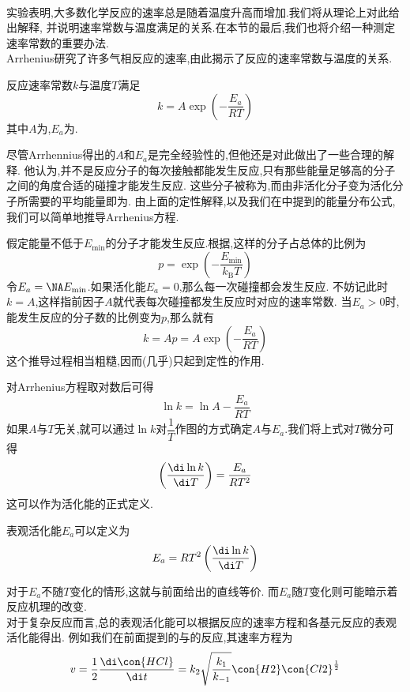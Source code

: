 \documentclass{ctexart}
\begin{document}
\pagestyle{plain}
\noindent{}\vspace{15pt}\\
\indent 实验表明,大多数化学反应的速率总是随着温度升高而增加.我们将从理论上对此给出解释,%
并说明速率常数与温度满足的关系.在本节的最后,我们也将介绍一种测定速率常数的重要办法.\vspace{12pt}\\
\indent Arrhenius研究了许多气相反应的速率,由此揭示了反应的速率常数与温度的关系.
\begin{theorem}[7E.1.1 Arrhenius方程]
    反应速率常数$k$与温度$T$满足
    \[k=A\exp\left(-\dfrac{E_a}{RT}\right)\]
    其中$A$为,$E_a$为.
\end{theorem}
尽管Arrhennius得出的$A$和$E_a$是完全经验性的,但他还是对此做出了一些合理的解释.%
他认为,并不是反应分子的每次接触都能发生反应,只有那些能量足够高的分子之间的角度合适的碰撞才能发生反应.%
这些分子被称为,而由非活化分子变为活化分子所需要的平均能量即为.%
由上面的定性解释,以及我们在中提到的能量分布公式,我们可以简单地推导Arrhenius方程.
\begin{derivation}
    假定能量不低于$E_{\min}$的分子才能发生反应.根据,这样的分子占总体的比例为
    \[p=\exp\left(-\dfrac{E_{\min}}{k_\text{B}T}\right)\]
    令$E_a=\NA E_{\min}$.如果活化能$E_a=0$,那么每一次碰撞都会发生反应.%
    不妨记此时$k=A$,这样指前因子$A$就代表每次碰撞都发生反应时对应的速率常数.%
    当$E_a>0$时,能发生反应的分子数的比例变为$p$,那么就有
    \[k=Ap=A\exp\left(-\dfrac{E_a}{RT}\right)\]
    这个推导过程相当粗糙,因而(几乎)只起到定性的作用.
\end{derivation}
对Arrhenius方程取对数后可得
\[\ln k=\ln A-\dfrac{E_a}{RT}\]
如果$A$与$T$无关,就可以通过$\ln k$对$\dfrac1T$作图的方式确定$A$与$E_a$.我们将上式对$T$微分可得
\[\left(\dfrac{\di\ln k}{\di T}\right)=\dfrac{E_a}{RT^2}\]
这可以作为活化能的正式定义.
\begin{definition}[7E.1.2 表观活化能]
    表观活化能$E_a$可以定义为
    \[E_a=RT^2\left(\dfrac{\di\ln k}{\di T}\right)\]

\end{definition}
对于$E_a$不随$T$变化的情形,这就与前面给出的直线等价.%
而$E_a$随$T$变化则可能暗示着反应机理的改变.\\
\indent 对于复杂反应而言,总的表观活化能可以根据反应的速率方程和各基元反应的表观活化能得出.%
例如我们在前面提到的与的反应,其速率方程为
\[v=\dfrac{1}{2}\dfrac{\di\con{HCl}}{\di t}=k_2\sqrt{\dfrac{k_1}{k_{-1}}}\con{H2}\con{Cl2}^{\frac12}\]
\end{document}
